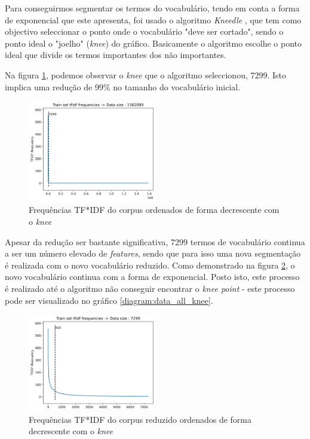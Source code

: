 \begin{enumerate}
Para conseguirmos segmentar os termos do vocabulário, tendo em conta a forma de exponencial que este apresenta, foi usado o algoritmo \textit{Kneedle} \cite{Kneedle}, que tem como objectivo seleccionar o ponto onde o vocabulário "deve ser cortado", sendo o ponto ideal o "joelho" (\textit{knee}) do gráfico. Basicamente o algoritmo escolhe o ponto ideal que divide os termos importantes dos não importantes.

Na figura \ref{diagram:data_knee}, podemos observar o \textit{knee} que o algoritmo seleccionou, 7299. Isto implica uma redução de 99\% no tamanho do vocabulário inicial. 

\begin{figure}[t]
\begin{center}
\includegraphics[width=0.5\textwidth,keepaspectratio]{figures/data_knee.png}
\caption{Frequências TF*IDF do corpus ordenados de forma decrescente com o \textit{knee}}
\label{diagram:data_knee}
\centering
\end{center}
\end{figure}

Apesar da redução ser bastante significativa, 7299 termos de vocabulário continua a ser um número elevado de \textit{features}, sendo que para isso uma nova segmentação é realizada com o novo vocabulário reduzido. Como demonstrado na figura \ref{diagram:data_second_knee},  o novo vocabulário continua com a forma de exponencial. Posto isto, este processo é realizado até o algoritmo não conseguir encontrar o \textit{knee point} - este processo pode ser visualizado no gráfico \ref{diagram:data_all_knee}.

\begin{figure}[t]
\begin{center}
\includegraphics[width=0.5\textwidth,keepaspectratio]{figures/data_size_503.png}
\caption{Frequências TF*IDF do corpus reduzido ordenados de forma decrescente com o \textit{knee}}
\label{diagram:data_second_knee}
\centering
\end{center}
\end{figure}


\end{enumerate}
